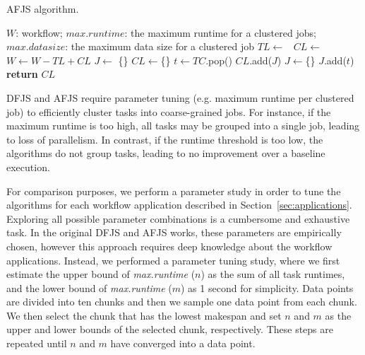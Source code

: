 \begin{algorithm}[!htb]
	\caption{ AFJS algorithm.}
	\footnotesize
	\label{alg:evaluation_afjs}
	\begin{algorithmic}[1]
		\Require $W$: workflow; $max.runtime$: the maximum runtime for a clustered jobs; $max.datasize$: the maximum data size for a clustered job
				\State $TL\gets $\  
				\State $CL\gets$  \  
				\State $W \gets W - TL + CL$   
			\EndFor
		\EndProcedure
			\State $J\gets$ \{\}
			\State $CL\gets$\{\}
				\State $t \gets TC$.pop() 
				\State	$CL$.add($J$)
				\State	$J \gets$\{\}
				\EndIf	
				\State $J$.add($t$)
			\EndWhile
			\State \textbf{return} $CL$
		\EndProcedure
	\end{algorithmic}
\end{algorithm}

DFJS and AFJS require parameter tuning (e.g. maximum runtime per clustered job) to efficiently cluster tasks into coarse-grained jobs. For instance, if the maximum runtime is too high, all tasks may be grouped into a single job, leading to loss of parallelism. In contrast, if the runtime threshold is too low, the algorithms do not group tasks, leading to no improvement over a baseline execution. 

For comparison purposes, we perform a parameter study in order to tune the algorithms for each workflow application described in Section~\ref{sec:applications}. Exploring all possible parameter combinations is a cumbersome and exhaustive task. In the original DFJS and AFJS works, these parameters are empirically chosen, however this approach requires deep knowledge about the workflow applications. Instead, we performed a parameter tuning study, where we first estimate the upper bound of \emph{max.runtime} ($n$) as the sum of all task runtimes, and the lower bound of \emph{max.runtime} ($m$) as 1 second for simplicity. Data points are divided into ten chunks and then we sample one data point from each chunk. We then select the chunk that has the lowest makespan and set $n$ and $m$ as the upper and lower bounds of the selected chunk, respectively. These steps are repeated until $n$ and $m$ have converged into a data point.

